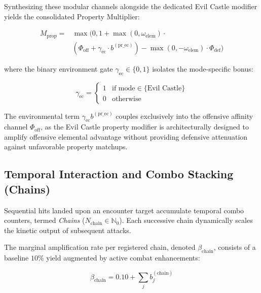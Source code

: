 \documentclass[twocolumn,10pt]{article}
\begin{document}
Synthesizing these modular channels alongside the dedicated Evil Castle modifier yields the consolidated Property Multiplier:

\begin{equation}
\label{eq:prop_multiplier}
\begin{aligned}
  M_{\text{prop}} ={}& \max \Big(0, 1 + \max(0, \omega_{\text{elem}}) \cdot\\
  & \left(\Phi_{\text{off}} + \gamma_{\text{ec}} \cdot b^{(\text{pr\_ec})}\right) - \max(0, -\omega_{\text{elem}}) \cdot \Phi_{\text{def}}\Big)
\end{aligned}
\end{equation}

where the binary environment gate $\gamma_{\text{ec}} \in \{0, 1\}$ isolates the mode-specific bonus:

\begin{equation}
\label{eq:gamma_ec}
  \gamma_{\text{ec}} = 
  \begin{cases} 
    1 & \text{if mode} \in \{\text{Evil Castle}\} \\ 
    0 & \text{otherwise} 
  \end{cases}
\end{equation}

The environmental term $\gamma_{\text{ec}} b^{(\text{pr\_ec})}$ couples exclusively into the offensive affinity channel $\Phi_{\text{off}}$, as the Evil Castle property modifier is architecturally designed to amplify offensive elemental advantage without providing defensive attenuation against unfavorable property matchups.

\subsection{Temporal Interaction and Combo Stacking (Chains)}
\label{sec:chains}
Sequential hits landed upon an encounter target accumulate temporal combo counters, termed \textit{Chains} ($N_{\text{chain}} \in \mathbb{N}_0$). Each successive chain dynamically scales the kinetic output of subsequent attacks.

The marginal amplification rate per registered chain, denoted $\beta_{\text{chain}}$, consists of a baseline $10\%$ yield augmented by active combat enhancements:

\begin{equation}
\label{eq:chain_rate}
  \beta_{\text{chain}} = 0.10 + \sum_{j} b_j^{(\text{chain})}
\end{equation}
\end{document}
